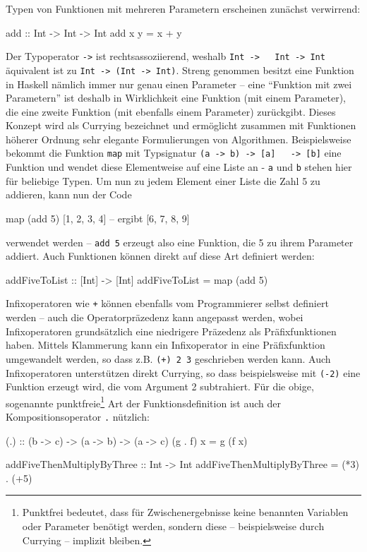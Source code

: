 \documentclass[12pt, a4paper, bibgerm]{scrbook}
\newenvironment{DIFnomarkup}{}{}
\newcommand\icode[1]{\lstinline?#1?}
\begin{document}
Typen von Funktionen mit mehreren Parametern erscheinen
zunächst verwirrend:
\begin{DIFnomarkup}\begin{code}
add :: Int -> Int -> Int
add x y = x + y  
\end{code}\end{DIFnomarkup}
Der Typoperator \icode{->} ist rechtsassoziierend, weshalb \icode{Int ->
  Int -> Int} äquivalent ist zu \icode{Int -> (Int -> Int)}. Streng
genommen besitzt eine Funktion in Haskell nämlich immer nur genau einen
Parameter -- eine "`Funktion mit zwei Parametern"' ist deshalb in
Wirklichkeit eine Funktion (mit einem Parameter), die eine zweite
Funktion (mit ebenfalls einem Parameter) zurückgibt. Dieses Konzept wird
als Currying bezeichnet und ermöglicht zusammen mit Funktionen höherer
Ordnung sehr elegante Formulierungen von Algorithmen. Beispielsweise
bekommt die Funktion \icode{map} mit Typsignatur \icode{(a -> b) -> [a]
  -> [b]} eine Funktion und wendet diese Elementweise auf eine Liste an
- \icode{a} und \icode{b} stehen hier für beliebige Typen. Um nun zu
jedem Element einer Liste die Zahl 5 zu addieren, kann nun der Code
\begin{DIFnomarkup}\begin{code}
map (add 5) [1, 2, 3, 4]  -- ergibt [6, 7, 8, 9]
\end{code}\end{DIFnomarkup}
verwendet werden -- \icode{add 5} erzeugt also eine Funktion, die 5 zu
ihrem Parameter addiert. Auch Funktionen können direkt auf diese Art
definiert werden:
\begin{DIFnomarkup}\begin{code}
addFiveToList :: [Int] -> [Int]
addFiveToList = map (add 5)
\end{code}\end{DIFnomarkup}

Infixoperatoren wie \icode{+} können ebenfalls vom Programmierer selbst
definiert werden -- auch die Operatorpräzedenz kann angepasst werden,
wobei Infixoperatoren grundsätzlich eine niedrigere Präzedenz als
Präfixfunktionen haben. Mittels Klammerung kann ein Infixoperator in
eine Präfixfunktion umgewandelt werden, so dass z.B. \icode{(+) 2 3}
geschrieben werden kann. Auch Infixoperatoren unterstützen direkt
Currying, so dass beispielsweise mit \icode{(-2)} eine Funktion erzeugt
wird, die vom Argument 2 subtrahiert. Für die obige, sogenannte
punktfreie\footnote{Punktfrei bedeutet, dass für Zwischenergebnisse
  keine benannten Variablen oder Parameter benötigt werden, sondern
  diese -- beispielsweise durch Currying -- implizit bleiben.} Art der
Funktionsdefinition ist auch der Kompositionsoperator \icode{.}
nützlich:
\begin{DIFnomarkup}\begin{code}
(.) :: (b -> c) -> (a -> b) -> (a -> c)
(g . f) x = g (f x)

addFiveThenMultiplyByThree :: Int -> Int
addFiveThenMultiplyByThree = (*3) . (+5)
\end{code}\end{DIFnomarkup}
\end{document}
